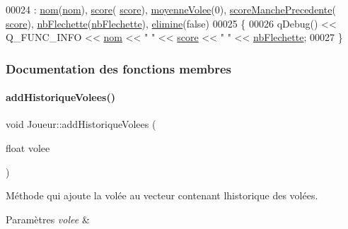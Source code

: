 \begin{DoxyCode}
00024                                                       : \hyperlink{class_joueur_ab06d7f1e6b482299bb03919e0cd2166d}{nom}(\hyperlink{class_joueur_ab06d7f1e6b482299bb03919e0cd2166d}{nom}), \hyperlink{class_joueur_a680896b9ff71c2762ae653ef6aa7c8ce}{score}(
      \hyperlink{class_joueur_a680896b9ff71c2762ae653ef6aa7c8ce}{score}), \hyperlink{class_joueur_ac5641a2a8fc1deebe5bba27bf21eb446}{moyenneVolee}(0), \hyperlink{class_joueur_ac78f2e83781d2bdeb9a613dc37812736}{scoreManchePrecedente}(
      \hyperlink{class_joueur_a680896b9ff71c2762ae653ef6aa7c8ce}{score}), \hyperlink{class_joueur_a330099a1952fbf97b2faea2c640b32f5}{nbFlechette}(\hyperlink{class_joueur_a330099a1952fbf97b2faea2c640b32f5}{nbFlechette}), \hyperlink{class_joueur_acac733012102f81d05b0a4c0801fcf61}{elimine}(\textcolor{keyword}{false})
00025 \{
00026     qDebug() << Q\_FUNC\_INFO << \hyperlink{class_joueur_ab06d7f1e6b482299bb03919e0cd2166d}{nom} << \textcolor{stringliteral}{" "} << \hyperlink{class_joueur_a680896b9ff71c2762ae653ef6aa7c8ce}{score} << \textcolor{stringliteral}{" "} << \hyperlink{class_joueur_a330099a1952fbf97b2faea2c640b32f5}{nbFlechette};
00027 \}
\end{DoxyCode}


\subsubsection{Documentation des fonctions membres}
\mbox{\label{class_joueur_a219d4e16e9396f56d73485b038fc2d8f}} 
\paragraph{\texorpdfstring{add\+Historique\+Volees()}{addHistoriqueVolees()}}
{\footnotesize\ttfamily void Joueur\+::add\+Historique\+Volees (\begin{DoxyParamCaption}\item[{float}]{volee }\end{DoxyParamCaption})}



Méthode qui ajoute la volée au vecteur contenant l\textquotesingle{}historique des volées. 


\begin{DoxyParams}{Paramètres}
{\em volee} & \\
\hline
\end{DoxyParams}


